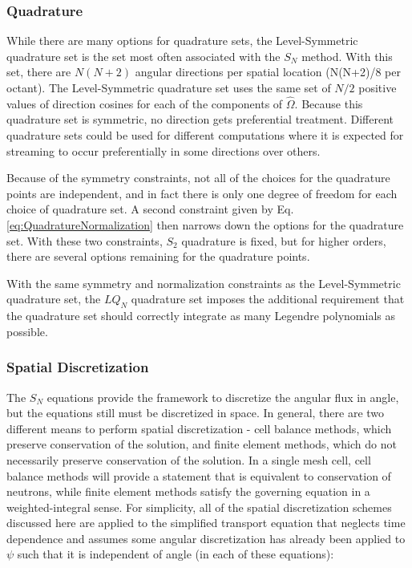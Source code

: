 \documentclass[10pt]{article}
\newcounter{subsubsubsection}[subsubsection]
\begin{document}
\begin{flushleft}
\subsubsection{Quadrature}

While there are many options for quadrature sets, the Level-Symmetric quadrature set is the set most often associated with the \(S_N\) method. With this set, there are \(N(N+2)\) angular directions per spatial location (N(N+2)/8 per octant). The Level-Symmetric quadrature set uses the same set of \(N/2\) positive values of direction cosines for each of the components of \(\hat{\Omega}\). Because this quadrature set is symmetric, no direction gets preferential treatment. Different quadrature sets could be used for different computations where it is expected for streaming to occur preferentially in some directions over others. 

Because of the symmetry constraints, not all of the choices for the quadrature points are independent, and in fact there is only one degree of freedom for each choice of quadrature set. A second constraint given by Eq. \eqref{eq:QuadratureNormalization} then narrows down the options for the quadrature set. With these two constraints, \(S_2\) quadrature is fixed, but for higher orders, there are several options remaining for the quadrature points. 


With the same symmetry and normalization constraints as the Level-Symmetric quadrature set, the \(LQ_N\) quadrature set imposes the additional requirement that the quadrature set should correctly integrate as many Legendre polynomials as possible. 

\subsubsection{Spatial Discretization}

The \(S_N\) equations provide the framework to discretize the angular flux in angle, but the equations still must be discretized in space. In general, there are two different means to perform spatial discretization - cell balance methods, which preserve conservation of the solution, and finite element methods, which do not necessarily preserve conservation of the solution. In a single mesh cell, cell balance methods will provide a statement that is equivalent to conservation of neutrons, while finite element methods satisfy the governing equation in a weighted-integral sense. For simplicity, all of the spatial discretization schemes discussed here are applied to the simplified transport equation that neglects time dependence and assumes some angular discretization has already been applied to \(\psi\) such that it is independent of angle (in each of these equations):


\end{flushleft}
\end{document}
